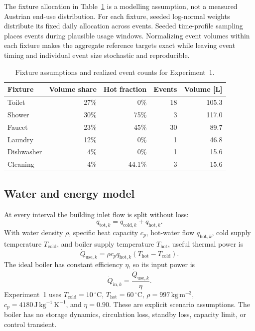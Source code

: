 \documentclass[11pt,a4paper]{article}
\begin{document}
The fixture allocation in Table~\ref{tab:fixtures} is a modelling assumption,
not a measured Austrian end-use distribution. For each fixture, seeded
log-normal weights distribute its fixed daily allocation across events. Seeded
time-profile sampling places events during plausible usage windows. Normalizing
event volumes within each fixture makes the aggregate reference targets exact
while leaving event timing and individual event size stochastic and
reproducible.

\begin{table}[htbp]
  \centering
  \caption{Fixture assumptions and realized event counts for Experiment~1.}
  \label{tab:fixtures}
  \begin{tabular}{lrrrr}
    \toprule
    Fixture & Volume share & Hot fraction & Events & Volume [L] \\
    \midrule
    Toilet & 27\% & 0\% & 18 & 105.3 \\
    Shower & 30\% & 75\% & 3 & 117.0 \\
    Faucet & 23\% & 45\% & 30 & 89.7 \\
    Laundry & 12\% & 0\% & 1 & 46.8 \\
    Dishwasher & 4\% & 0\% & 1 & 15.6 \\
    Cleaning & 4\% & 44.1\% & 3 & 15.6 \\
    \bottomrule
  \end{tabular}
\end{table}

\subsection{Water and energy model}
At every interval the building inlet flow is split without loss:
\begin{equation}
  q_{\mathrm{tot},k}=q_{\mathrm{cold},k}+q_{\mathrm{hot},k}.
\end{equation}
With water density $\rho$, specific heat capacity $c_p$, hot-water flow
$q_{\mathrm{hot},k}$, cold supply temperature $T_{\mathrm{cold}}$, and boiler
supply temperature $T_{\mathrm{hot}}$, useful thermal power is
\begin{equation}
  \dot Q_{\mathrm{use},k} = \rho c_p q_{\mathrm{hot},k}
  \left(T_{\mathrm{hot}}-T_{\mathrm{cold}}\right).
\end{equation}
The ideal boiler has constant efficiency $\eta$, so its input power is
\begin{equation}
  \dot Q_{\mathrm{in},k}=\frac{\dot Q_{\mathrm{use},k}}{\eta}.
\end{equation}
Experiment~1 uses $T_{\mathrm{cold}}=10\,^{\circ}\mathrm{C}$,
$T_{\mathrm{hot}}=60\,^{\circ}\mathrm{C}$, $\rho=997\,\mathrm{kg\,m^{-3}}$,
$c_p=4180\,\mathrm{J\,kg^{-1}\,K^{-1}}$, and $\eta=0.90$. These are explicit
scenario assumptions. The boiler has no storage dynamics, circulation loss,
standby loss, capacity limit, or control transient.
\end{document}

